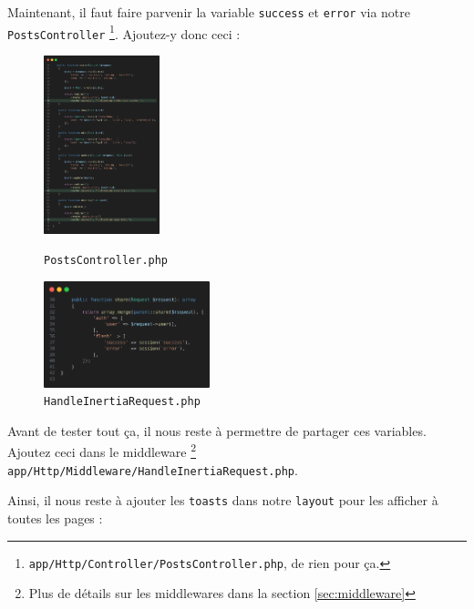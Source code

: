 Maintenant, il faut faire parvenir la variable \texttt{success} et \texttt{error} via notre \\ \texttt{PostsController} \footnote{\texttt{app/Http/Controller/PostsController.php}, de rien pour ça.}. Ajoutez-y donc ceci :

\begin{figure}[!h]
    \hspace{1cm}
    \includegraphics[width=0.3\textwidth]{figures-C1/postscontroller_toast.png}
    \label{fig:postscontroller_toast}
    \captionsetup{
    justification=raggedright,
    singlelinecheck=false
    }
    \caption{\texttt{PostsController.php}}
\end{figure}

\newpage

\begin{figure}
    \vspace{-0.5cm}
    \includegraphics[width=0.43\textwidth]{figures-C1/middleware_handleinertia.png}    
    \captionsetup{singlelinecheck=false}   
    \caption{\texttt{HandleInertiaRequest.php}}
    \label{fig:middleware_toast}
\end{figure}

Avant de tester tout ça, il nous reste à permettre \inertia{} de partager ces variables. Ajoutez ceci dans le middleware \footnote{Plus de détails sur les middlewares dans la section \ref{sec:middleware}} \\ \texttt{app/Http/Middleware/HandleInertiaRequest.php}.

Ainsi, il nous reste à ajouter les \texttt{toasts} dans notre \texttt{layout} pour les afficher à toutes les pages :


